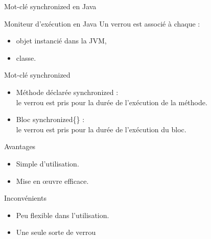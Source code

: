 
\begingroup

\begin{frame}{Mot-clé \alert{synchronized} en Java}

  \begin{alertblock}{Moniteur d'exécution en Java}
    Un \alert{verrou} est associé à chaque :
    \begin{itemize}
    \item objet instancié dans la JVM,
    \item classe.
    \end{itemize}
  \end{alertblock}
  
  \begin{block}{Mot-clé \alert{synchronized}}
    \begin{itemize}
    \item Méthode  déclarée \alert{synchronized} :\\le  verrou est pris
      pour la durée de l'exécution de la méthode. 
    \item Bloc \alert{synchronized\{\}} :\\le  verrou est pris
      pour la durée de l'exécution du bloc.
    \end{itemize}
  \end{block}

  \pause

  \begin{minipage}{.47\textwidth}
    \begin{exampleblock}{Avantages}
      \begin{itemize}
      \item Simple d'utilisation.
      \item Mise en \oe uvre efficace.
      \end{itemize}
    \end{exampleblock}
  \end{minipage}
  \hfill
  \begin{minipage}{.47\textwidth}
    \begin{alertblock}{Inconvénients}
      \begin{itemize}
      \item Peu flexible dans l'utilisation.
      \item Une seule sorte de verrou 
      \end{itemize}
    \end{alertblock}
  \end{minipage}
\end{frame}

\endgroup
\endinput
